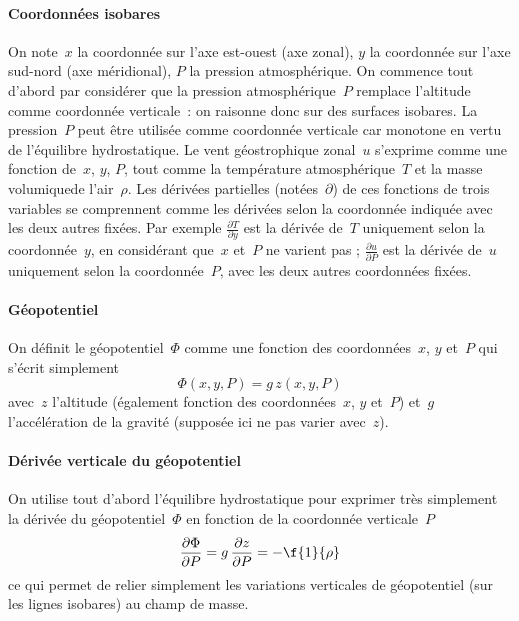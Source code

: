 \sk
\paragraph{Coordonnées isobares} On note~$x$ la coordonnée sur l'axe est-ouest (axe zonal), $y$ la coordonnée sur l'axe sud-nord (axe méridional), $P$ la pression atmosphérique. On commence tout d'abord par considérer que la pression atmosphérique~$P$ remplace l'altitude comme coordonnée verticale~: on raisonne donc sur des surfaces isobares. La pression~$P$ peut être utilisée comme coordonnée verticale car monotone en vertu de l'équilibre hydrostatique. Le vent géostrophique zonal~$u$ s'exprime comme une fonction de~$x$, $y$, $P$, tout comme la température atmosphérique~$T$ et la masse volumiquede l'air~$\rho$. Les dérivées partielles (notées~$\partial$) de ces fonctions de trois variables se comprennent comme les dérivées selon la coordonnée indiquée avec les deux autres fixées. Par exemple $\frac{\partial T}{\partial y}$ est la dérivée de~$T$ uniquement selon la coordonnée~$y$, en considérant que~$x$ et~$P$ ne varient pas ; $\frac{\partial u}{\partial P}$ est la dérivée de~$u$ uniquement selon la coordonnée~$P$, avec les deux autres coordonnées fixées.

\sk
\paragraph{Géopotentiel} On définit le géopotentiel~$\Phi$ comme une fonction des coordonnées~$x$, $y$ et~$P$ qui s'écrit simplement
\[ \Phi(x,y,P)=g \, z(x,y,P) \] 
\noindent avec~$z$ l'altitude (également fonction des coordonnées~$x$, $y$ et~$P$) et~$g$ l'accélération de la gravité (supposée ici ne pas varier avec~$z$). 

\sk
\paragraph{Dérivée verticale du géopotentiel} On utilise tout d'abord l'équilibre hydrostatique pour exprimer très simplement la dérivée du géopotentiel~$\Phi$ en fonction de la coordonnée verticale~$P$
\[ \frac{\partial \Phi}{\partial P} = g \, \frac{\partial z}{\partial P} = -\f{1}{\rho} \] 
\noindent ce qui permet de relier simplement les variations verticales de géopotentiel (sur les lignes isobares) au champ de masse. 

